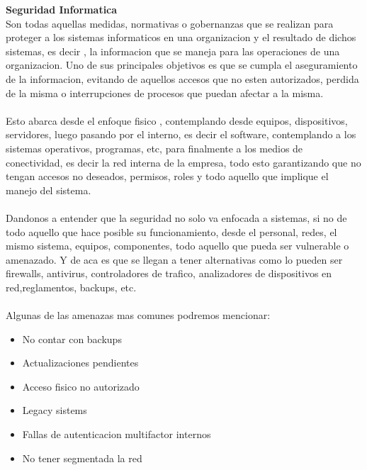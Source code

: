 \documentclass[12pt]{article}
\begin{document}
\textbf{Seguridad Informatica} \\
Son todas aquellas medidas, normativas o gobernanzas que se realizan para proteger a los sistemas informaticos en una organizacion y el resultado de dichos sistemas, es decir , la informacion que se maneja para las operaciones de una organizacion. Uno de sus principales objetivos es que se cumpla el aseguramiento de la informacion, evitando de aquellos accesos que no esten autorizados, perdida de la misma o interrupciones de procesos que puedan afectar a la misma. \\\\
Esto abarca desde el enfoque fisico , contemplando desde equipos, dispositivos, servidores, luego pasando por el interno, es decir el software, contemplando a los sistemas operativos, programas, etc, para finalmente a los medios de conectividad, es decir la red interna de la empresa, todo esto garantizando que no tengan accesos no deseados, permisos, roles y todo aquello que implique el manejo del sistema.\\\\
Dandonos a entender que la seguridad no solo va enfocada a sistemas, si no de todo aquello que hace posible su funcionamiento, desde el personal, redes, el mismo sistema, equipos, componentes, todo aquello que pueda ser vulnerable o amenazado. Y de aca es que se llegan a tener alternativas como lo pueden ser firewalls, antivirus, controladores de trafico, analizadores de dispositivos en red,reglamentos, backups, etc.\\\\
Algunas de las amenazas mas comunes podremos mencionar:
\begin{itemize}
    \item No contar con backups
    \item Actualizaciones pendientes
    \item Acceso fisico no autorizado
    \item Legacy sistems
    \item Fallas de autenticacion multifactor internos
    \item  No tener segmentada la red
\end{itemize}
\end{document}
